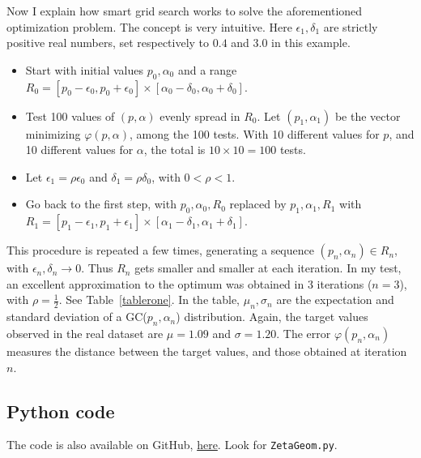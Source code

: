 \documentclass[oneside,10pt]{book}
\begin{document}
\noindent Now I explain how smart grid search works to solve the aforementioned optimization problem. The concept is very intuitive. Here $\epsilon_1, \delta_1$ are strictly positive real numbers, set respectively to $0.4$ and $3.0$ in this example. \vspace{1ex}
\begin{itemize}
 \item Start with initial values
 $p_0,\alpha_0$ and a range $R_0 = [p_0 - \epsilon_0, p_0+\epsilon_0] \times [\alpha_0 - \delta_0, \alpha_0+\delta_0]$.
\item Test 
100 values of $(p,\alpha)$ evenly spread in $R_0$. 
Let $(p_1,\alpha_1)$ be the vector minimizing $\varphi(p,\alpha)$, among the
 100 tests. 
With 10 different values for $p$, and 10 different values for $\alpha$, the total is $10\times 10 = 100$ tests.
\item Let $\epsilon_1 = \rho \epsilon_0$ and $\delta_1 = \rho \delta_0$, with $0<\rho<1$.
\item Go back to the first step, with $p_0,\alpha_0, R_0$ replaced by $p_1,\alpha_1, R_1$
 with $R_1 = [p_1 - \epsilon_1, p_1+\epsilon_1] \times [\alpha_1 - \delta_1, \alpha_1+\delta_1]$.
\end{itemize}\vspace{1ex}
This procedure is repeated a few times, generating a sequence $(p_n,\alpha_n)\in R_n$, with $\epsilon_n, \delta_n \rightarrow 0$.
 Thus $R_n$ gets smaller and smaller at each iteration. In my test, an excellent approximation to the optimum was
 obtained in 3 iterations ($n=3$), with $\rho=\frac{1}{2}$. See Table~\ref{tablerone}. In the table, $\mu_n,\sigma_n$ are the
 expectation and standard deviation of a GC($p_n,\alpha_n$) distribution. Again, the target
 values observed in the real dataset are $\mu=1.09$ and $\sigma = 1.20$. The error $\varphi(p_n,\alpha_n)$ measures
 the distance between the target values, and those obtained at iteration $n$.




  
   

\subsection{Python code}\label{mangeputy}

The code is also available on GitHub, 
 \href{https://github.com/VincentGranville/Statistical-Optimization/blob/main/ZetaGeom.py}{here}.
Look for \texttt{ZetaGeom.py}.
\vspace{1ex}
\end{document}
